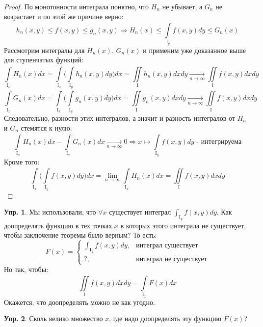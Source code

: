 \documentclass[12pt]{article}
\newcommand{\MI}{\mathrm{I}}
\theoremstyle{definition}
\newtheorem{exrc}{Упр.}
\newcommand{\ddint}[2]{\displaystyle\int\limits_{#1}^{#2}}
\begin{document}
\begin{proof}
	По монотонности интеграла понятно, что $H_n$ не убывает, а $G_n$ не возрастает и по этой же причине верно:
	$$
		h_n(x,y) \leq f(x,y) \leq g_n(x,y) \Rightarrow H_n(x) \leq \ddint{\MI_y}{}f(x,y)dy \leq G_n(x)
	$$
	Рассмотрим интегралы для $H_n(x), \, G_n(x)$ и применим уже доказанное выше для ступенчатых функций:
	$$
		\ddint{\MI_x}{}H_n(x)dx = \ddint{\MI_x}{}\Bigg(\ddint{\MI_y}{}h_n(x,y)dy   \Bigg)dx = \iint\limits_{\MI}{}h_n(x,y)dxdy \xrightarrow[n \to \infty]{} \iint\limits_{\MI}{}f(x,y)dxdy
	$$
	$$
		\ddint{\MI_x}{}G_n(x)dx = \ddint{\MI_x}{}\Bigg(\ddint{\MI_y}{}g_n(x,y)dy   \Bigg)dx = \iint\limits_{\MI}{}g_n(x,y)dxdy  \xrightarrow[n \to \infty]{} \iint\limits_{\MI}{}f(x,y)dxdy
	$$
	Следовательно, разности этих интегралов, а значит и разность интегралов от $H_n$ и $G_n$ стемятся к нулю:
	$$
		\ddint{\MI_x}{}H_n(x)dx - \ddint{\MI_x}{}G_n(x) dx \xrightarrow[n\to \infty]{} 0 \Rightarrow x \mapsto \ddint{\MI_y}{}f(x,y)dy \text{ - интегрируема}
	$$
	Кроме того: 
	$$
		\ddint{\MI_x}{}\Bigg(\ddint{\MI_y}{}f(x,y)dy \Bigg)dx = \lim\limits_{n \to  \infty}\ddint{\MI_x}{}H_n(x)dx = \iint\limits_{\MI}{}f(x,y)dxdy
	$$
\end{proof}
\begin{exrc}
	Мы использовали, что $\forall x$ существует интеграл $\int_{\MI_y}f(x,y)dy$. Как доопределять функцию в тех точках $x$ в которых этого интеграла не существует, чтобы заключение теоремы было верным? То есть:
	$$
		F(x) = 
		\begin{cases}
			\int_{\MI_y}f(x,y)dy, & \text{интеграл существует}\\
			?, & \text{интеграл не существует}
		\end{cases}
	$$
	Но так, чтобы:
	$$
		\iint\limits_{\MI}f(x,y)dxdy = \ddint{\MI_x}{}F(x)dx
	$$
	Окажется, что доопределять можно не как угодно.
\end{exrc}
\begin{exrc}
	Сколь велико множество $x$, где надо доопределять эту функцию $F(x)$?
\end{exrc}
\end{document}
